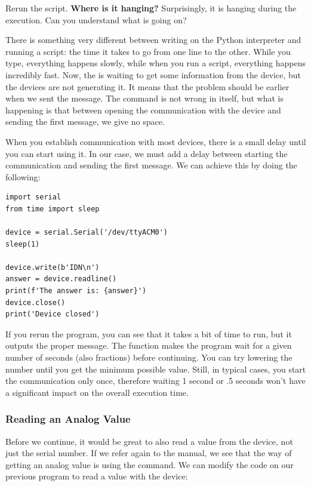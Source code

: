Rerun the script. \textbf{Where is it hanging?} Surprisingly, it is hanging during the  execution. Can you understand what is going on?

There is something very different between writing on the Python interpreter and running a script: the time it takes to go from one line to the other. While you type, everything happens slowly, while when you run a script, everything happens incredibly fast. Now, the  is waiting to get some information from the device, but the devices are not generating it. It means that the problem should be earlier when we sent the  message. The command is not wrong in itself, but what is happening is that between opening the communication with the device and sending the first message, we give no space.

When you establish communication with most devices, there is a small delay until you can start using it. In our case, we must add a delay between starting the communication and sending the first message. We can achieve this by doing the following:

\begin{verbatim}
import serial
from time import sleep

device = serial.Serial('/dev/ttyACM0')
sleep(1)

device.write(b'IDN\n')
answer = device.readline()
print(f'The answer is: {answer}')
device.close()
print('Device closed')
\end{verbatim}

If you rerun the program, you can see that it takes a bit of time to run, but it outputs the proper message. The  function makes the program wait for a given number of seconds (also fractions) before continuing. You can try lowering the number until you get the minimum possible value. Still, in typical cases, you start the communication only once, therefore waiting 1 second or .5 seconds won't have a significant impact on the overall execution time.

\subsubsection{Reading an Analog Value}
Before we continue, it would be great to also read a value from the device, not just the serial number. If we refer again to the manual, we see that the way of getting an analog value is using the  command. We can modify the code on our previous program to read a value with the device:

